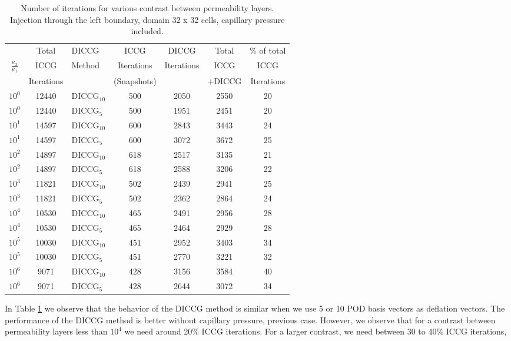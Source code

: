 \documentclass[12pt]{article}
\begin{document}
{\begin{table}[!h]\centering
\begin{minipage}{1\textwidth}
 \centering
\begin{tabular}{ ||c|c||l|c|c|c|c||} 
\hline
&Total& DICCG & ICCG&DICCG &Total&\% of total\\ 
         $\frac{\kappa_2}{\kappa_1}$  & ICCG       & Method & Iterations & Iterations&ICCG& ICCG\\ 
                           &  Iterations&        &  (Snapshots)   & &+DICCG&Iterations \\ 
\hline  
$10^{0}$ &12440& DICCG$_{10}$&500&2050&2550&20 \\ 
\hline  
$10^{0}$ &12440& DICCG$_{5}$&500&1951&2451&20 \\ 
\hline 
$10^{1}$ &14597& DICCG$_{10}$&600&2843&3443&24 \\ 
\hline  
$10^{1}$ &14597& DICCG$_{5}$&600&3072&3672&25 \\ 
\hline 
$10^{2}$ &14897& DICCG$_{10}$&618&2517&3135&21 \\ 
\hline  
$10^{2}$ &14897& DICCG$_{5}$&618&2588&3206&22 \\ 
\hline  
$10^{3}$ &11821& DICCG$_{10}$&502&2439&2941&25 \\ 
\hline  
$10^{3}$ &11821& DICCG$_{5}$&502&2362&2864&24 \\ 
\hline 
$10^{4}$ &10530& DICCG$_{10}$&465&2491&2956&28 \\ 
\hline  
$10^{4}$ &10530& DICCG$_{5}$&465&2464&2929&28 \\ 
\hline 
$10^{5}$ &10030& DICCG$_{10}$&451&2952&3403&34 \\ 
\hline  
$10^{5}$ &10030& DICCG$_{5}$&451&2770&3221&32 \\ 
\hline 
$10^{6}$ &9071& DICCG$_{10}$&428&3156&3584&40 \\ 
\hline  
$10^{6}$ &9071& DICCG$_{5}$&428&2644&3072&34 \\ 
\hline  
\end{tabular} 
\caption{Number of iterations for various contrast between permeability layers. Injection through the left boundary, domain 32 x 32 cells, capillary pressure included.}\label{table:liter1a} 
\end{minipage}  
\end{table}  
In Table \ref{table:liter1a} we observe that the behavior of the DICCG method is similar when we use 5 or 10 POD basis vectors as deflation vectors. The performance of the DICCG method is better without capillary pressure, previous case. However, we observe that for a contrast between permeability layers less than $10^4$ we need around 20\% ICCG iterations. For a larger contrast, we need between 30 to 40\% ICCG iterations, 
}
\end{document}
